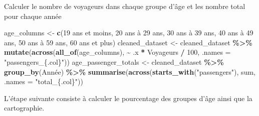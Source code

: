 \documentclass[
]{article}
\newenvironment{Shaded}{\begin{snugshade}}{\end{snugshade}}
\newcommand{\AttributeTok}[1]{\textcolor[rgb]{0.13,0.29,0.53}{#1}}
\newcommand{\DecValTok}[1]{\textcolor[rgb]{0.00,0.00,0.81}{#1}}
\newcommand{\FunctionTok}[1]{\textcolor[rgb]{0.13,0.29,0.53}{\textbf{#1}}}
\newcommand{\NormalTok}[1]{#1}
\newcommand{\OtherTok}[1]{\textcolor[rgb]{0.56,0.35,0.01}{#1}}
\newcommand{\SpecialCharTok}[1]{\textcolor[rgb]{0.81,0.36,0.00}{\textbf{#1}}}
\newcommand{\StringTok}[1]{\textcolor[rgb]{0.31,0.60,0.02}{#1}}
\begin{document}
Calculer le nombre de voyageurs dans chaque groupe d'âge et les nombre
total pour chaque année

\begin{Shaded}
\begin{Highlighting}[]
\NormalTok{age\_columns }\OtherTok{\textless{}{-}} \FunctionTok{c}\NormalTok{(}\StringTok{\textquotesingle{}19 ans et moins\textquotesingle{}}\NormalTok{, }\StringTok{\textquotesingle{}20 ans à 29 ans\textquotesingle{}}\NormalTok{, }\StringTok{\textquotesingle{}30 ans à 39 ans\textquotesingle{}}\NormalTok{, }\StringTok{\textquotesingle{}40 ans à 49 ans\textquotesingle{}}\NormalTok{, }\StringTok{\textquotesingle{}50 ans à 59 ans\textquotesingle{}}\NormalTok{, }\StringTok{\textquotesingle{}60 ans et plus\textquotesingle{}}\NormalTok{)}
\NormalTok{cleaned\_dataset }\OtherTok{\textless{}{-}}\NormalTok{ cleaned\_dataset }\SpecialCharTok{\%\textgreater{}\%}
  \FunctionTok{mutate}\NormalTok{(}\FunctionTok{across}\NormalTok{(}\FunctionTok{all\_of}\NormalTok{(age\_columns), }\SpecialCharTok{\textasciitilde{}}\NormalTok{ .x }\SpecialCharTok{*}\NormalTok{ Voyageurs }\SpecialCharTok{/} \DecValTok{100}\NormalTok{, }\AttributeTok{.names =} \StringTok{"passengers\_\{.col\}"}\NormalTok{))}
\NormalTok{age\_passenger\_totals }\OtherTok{\textless{}{-}}\NormalTok{ cleaned\_dataset }\SpecialCharTok{\%\textgreater{}\%}
  \FunctionTok{group\_by}\NormalTok{(Année) }\SpecialCharTok{\%\textgreater{}\%}
  \FunctionTok{summarise}\NormalTok{(}\FunctionTok{across}\NormalTok{(}\FunctionTok{starts\_with}\NormalTok{(}\StringTok{"passengers"}\NormalTok{), sum, }\AttributeTok{.names =} \StringTok{"total\_\{.col\}"}\NormalTok{))}
\end{Highlighting}
\end{Shaded}

L'étape suivante consiste à calculer le pourcentage des groupes d'âge
ainsi que la cartographie.
\end{document}

